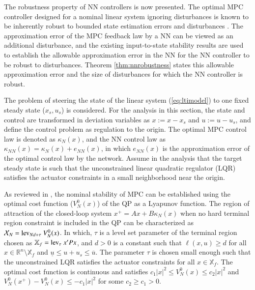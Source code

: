 \documentclass[preprint,5p, twocolumn, authoryear]{elsarticle}
\newcommand{\bbR}{\mathbb{R}}
\newcommand{\bbX}{\mathbb{X}}
\begin{document}
The robustness property of NN controllers 
is now presented. The optimal MPC controller
designed for a nominal linear system ignoring disturbances
is known to be inherently robust to bounded state 
estimation errors and disturbances
\citep*{heath:wills:2005, pannocchia:rawlings:wright:2011}. 
The approximation
error of the MPC feedback law by a NN can be viewed 
as an additional disturbance, and the existing
input-to-state stability
results \citep*{sontag:wang:1995} are used to establish the 
allowable approximation error in the NN for 
the NN controller to be robust to disturbances. 
Theorem \ref{thm:nnrobustness} states this 
allowable approximation error and the size 
of disturbances for which the NN controller is robust.

The problem of steering the state of the linear 
system (\ref{eq:ltimodel}) 
to one fixed steady state ($x_s, u_s$) is considered. 
For the analysis in this section, 
the state and control are transformed in deviation variables 
as $x := x - x_s$ and $u := u -u_s$,
and define the control problem as regulation to the origin.
The optimal MPC control law is denoted as $\kappa_N(x)$, 
and the NN control law as
$\kappa_{NN}(x) = \kappa_N(x) + e_{NN}(x)$, in which 
$e_{NN}(x)$ is the approximation error 
of the optimal control law by the network. Assume 
in the analysis that the target steady state 
is such that the unconstrained linear quadratic regulator (LQR)
satisfies the actuator constraints 
in a small neighborhood near the origin. 

As reviewed in \cite*{mayne:rawlings:rao:scokaert:2000},
the nominal stability of MPC can be established
using the optimal cost function ($V_N^0(x)$) of the QP
as a Lyapunov function.
The region of attraction of the closed-loop system 
$x^+ = Ax + B\kappa_N(x)$ when no hard terminal region 
constraint \citep*{limon:alamo:salas:camacho:2006}  
is included in the QP can be characterized
as $\mathcal{X}_N = \textnormal{lev}_{Nd + \tau} \ V_N^0(x)$.
In which, $\tau$ is a level
set parameter of the terminal region chosen as
$\bbX_f = \textnormal{lev}_{\tau} \ x'Px$, and $d > 0$
is a constant such that $\ell(x, u) \geq d$ for all 
$x \in \bbR^n \setminus \bbX_f$ and 
$\underline{u} \leq u+u_s \leq \overline{u}$.
The parameter $\tau$ is chosen small enough such that
the unconstrained LQR satisfies the actuator constraints 
for all $x \in \bbX_f$. The optimal cost 
function is continuous and satisfies 
$c_1\vert x \vert^2 \leq V_N^0(x) \leq c_2\vert x \vert^2$
and $V_N^0(x^+) - V_N^0(x) \leq -c_1\vert x \vert^2$ 
for some $c_2 \geq c_1 > 0$.
\end{document}
